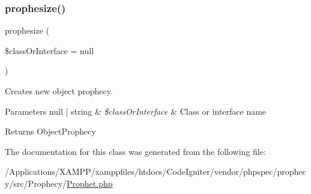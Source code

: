 \subsubsection{\texorpdfstring{prophesize()}{prophesize()}}
{\footnotesize\ttfamily prophesize (\begin{DoxyParamCaption}\item[{}]{\$class\+Or\+Interface = {\ttfamily null} }\end{DoxyParamCaption})}

Creates new object prophecy.


\begin{DoxyParams}[1]{Parameters}
null | string & {\em \$class\+Or\+Interface} & Class or interface name\\
\hline
\end{DoxyParams}
\begin{DoxyReturn}{Returns}
Object\+Prophecy 
\end{DoxyReturn}


The documentation for this class was generated from the following file\+:\begin{DoxyCompactItemize}
\item 
/\+Applications/\+X\+A\+M\+P\+P/xamppfiles/htdocs/\+Code\+Igniter/vendor/phpspec/prophecy/src/\+Prophecy/\mbox{\hyperlink{_prophet_8php}{Prophet.\+php}}\end{DoxyCompactItemize}
